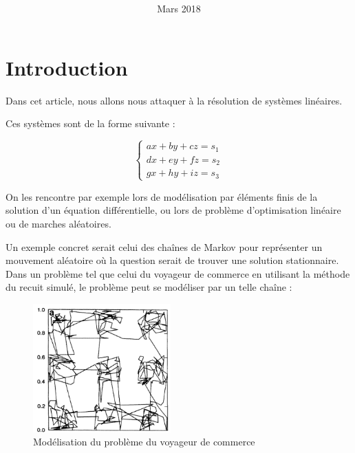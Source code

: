 \documentclass[11pt, a4paper]{article}
\title{
\LARGE{\textbf{\hmwkClass}}\\
\vspace{0.5in}
\large{\textbf{\hmwkTitle}}
\vspace{3in}
}
\author{\textbf{\hmwkAuthorName}}
\date{Mars 2018} %
\begin{document}
\maketitle



\newpage
\tableofcontents
\newpage

\section{Introduction}

Dans cet article, nous allons nous attaquer à la résolution de systèmes linéaires. 

Ces systèmes sont de la forme suivante :

\[
    \left\{
    \begin{array}{l}
        ax + by + cz = s_1\\
        dx + ey + fz = s_2\\
        gx + hy + iz = s_3
    \end{array}
    \right.
\]

On les rencontre par exemple lors de modélisation par éléments finis de la solution d'un équation différentielle, ou lors de problème d'optimisation linéaire ou de marches aléatoires.

Un exemple concret serait celui des cha\^ines de Markov pour représenter un mouvement aléatoire où la question serait de trouver une solution stationnaire.
Dans un problème tel que celui du voyageur de commerce en utilisant la méthode du recuit simulé, le problème peut se modéliser par un telle cha\^ine :

\begin{figure}[h]
    \centering
    \includegraphics[width=150pt]{travelling_salesman.png}
    \caption{Modélisation du problème du voyageur de commerce}
\end{figure}
\end{document}
